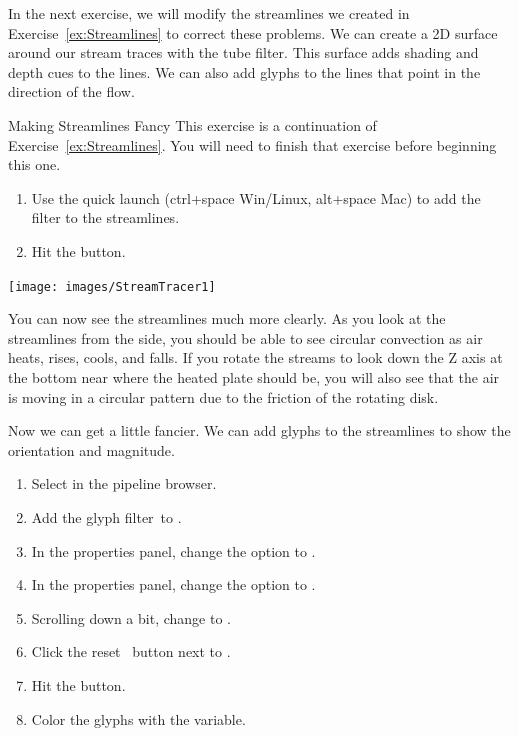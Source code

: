 In the next exercise, we will modify the streamlines we created in
Exercise~\ref{ex:Streamlines} to correct these problems.  We can create a
2D surface around our stream traces with the tube filter.  This surface
adds shading and depth cues to the lines.  We can also add glyphs to the
lines that point in the direction of the flow.

\begin{exercise}{Making Streamlines Fancy}
  \label{ex:MakingStreamlinesFancy}%
  This exercise is a continuation of Exercise~\ref{ex:Streamlines}.
  You will need to finish that exercise before beginning this one.

  \begin{enumerate}
  \item Use the quick launch (ctrl+space Win/Linux, alt+space Mac) to add
    the  filter to the streamlines.
  \item Hit the \apply button.
    \savecounter
  \end{enumerate}

  \begin{inlinefig}
    \texttt{[image: images/StreamTracer1]}
  \end{inlinefig}

  You can now see the streamlines much more clearly.  As you look at the
  streamlines from the side, you should be able to see circular convection
  as air heats, rises, cools, and falls.  If you rotate the streams to look
  down the Z axis at the bottom near where the heated plate should be, you
  will also see that the air is moving in a circular pattern due to the
  friction of the rotating disk.

  Now we can get a little fancier.  We can add glyphs to the streamlines to
  show the orientation and magnitude.

  \begin{enumerate}
    \restorecounter
  \item Select  in the pipeline browser.
  \item Add the glyph filter~\glyph to .
  \item In the properties panel, change the  option to
    .
  \item In the properties panel, change the  option to
    .
  \item Scrolling down a bit, change  to .
  \item Click the reset~ button next to .
  \item Hit the \apply button.
  \item Color the glyphs with the  variable.
  \end{enumerate}


\end{exercise}
